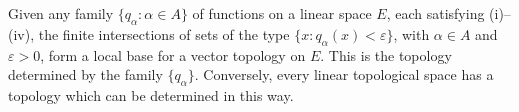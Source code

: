 Given any family $\{q_\alpha : \alpha \in A\}$ of functions on a linear space $E$, each satisfying (i)--(iv), the finite intersections of sets of the type $\{x : q_\alpha(x) < \varepsilon\}$, with $\alpha \in A$ and $\varepsilon > 0$, form a local base for a vector topology on $E$. This is the topology determined by the family $\{q_\alpha\}$. Conversely, every linear topological space has a topology which can be determined in this way.
